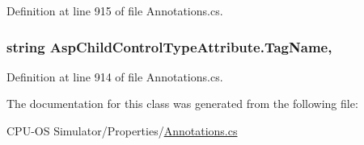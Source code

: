 Definition at line 915 of file Annotations.\+cs.

\hypertarget{class_asp_child_control_type_attribute_a9e30613d70a3bcffb32a4664a5d121d2}{}
\subsubsection[{Tag\+Name}]{\setlength{\rightskip}{0pt plus 5cm}string Asp\+Child\+Control\+Type\+Attribute.\+Tag\+Name\hspace{0.3cm}{\ttfamily [get]}, {}}\label{class_asp_child_control_type_attribute_a9e30613d70a3bcffb32a4664a5d121d2}


Definition at line 914 of file Annotations.\+cs.



The documentation for this class was generated from the following file\+:\begin{DoxyCompactItemize}
\item 
C\+P\+U-\/\+O\+S Simulator/\+Properties/\hyperlink{_annotations_8cs}{Annotations.\+cs}\end{DoxyCompactItemize}
